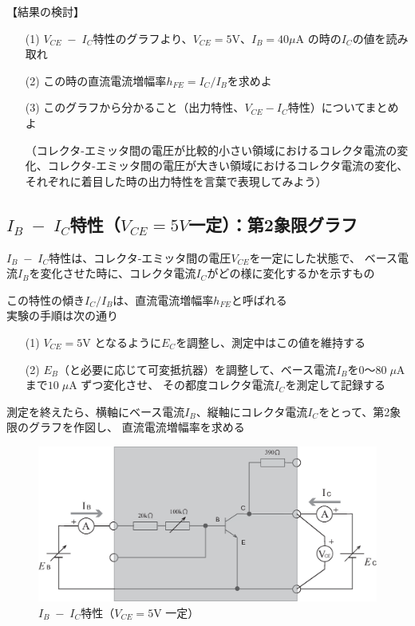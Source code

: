 \documentclass[uplatex,a4paper,11pt,oneside,openany]{jsbook}
\begin{document}
【結果の検討】

\begin{enumerate}
	\item[(1)] $V_{CE}\;-\;I_C$特性のグラフより、$V_{CE}=5$V、$I_B=40\mu$A の時の$I_C$の値を読み取れ\\
	\item[(2)] この時の直流電流増幅率$h_{FE}=I_C/I_B$を求めよ\\
	
	\item[(3)] このグラフから分かること（出力特性、$V_{CE}-I_C$特性）についてまとめよ
	
	（コレクタ-エミッタ間の電圧が比較的小さい領域におけるコレクタ電流の変化、コレクタ-エミッタ間の電圧が大きい領域におけるコレクタ電流の変化、それぞれに着目した時の出力特性を言葉で表現してみよう）
\end{enumerate}

\newpage

\subsection{$I_B\;-\;I_C$特性（$V_{CE}=5V$一定）：第2象限グラフ}

$I_B\;-\;I_C$特性は、コレクタ-エミッタ間の電圧$V_{CE}$を一定にした状態で、
ベース電流$I_B$を変化させた時に、コレクタ電流$I_C$がどの様に変化するかを示すもの

この特性の傾き$I_C/I_B$は、直流電流増幅率$h_{FE}$と呼ばれる\\

実験の手順は次の通り

\begin{enumerate}
	\item[(1)] $V_{CE}=5$V となるように$E_C$を調整し、測定中はこの値を維持する
	\item[(2)] $E_B$（と必要に応じて可変抵抗器）を調整して、ベース電流$I_B$を$0$〜$80\;\mu$A まで$10\;\mu$A ずつ変化させ、
	その都度コレクタ電流$I_C$を測定して記録する 
\end{enumerate}

測定を終えたら、横軸にベース電流$I_B$、縦軸にコレクタ電流$I_C$をとって、第2象限のグラフを作図し、
直流電流増幅率を求める

\vfill

\begin{figure}[H]
	\centering
	\includegraphics[keepaspectratio, scale=0.45, angle=0]
	{figs/eps/ex1.eps}
	\caption{$I_B\;-\;I_C$特性（$V_{CE}=5$V 一定）}
	\label{fig:ex2}
\end{figure}
\end{document}
